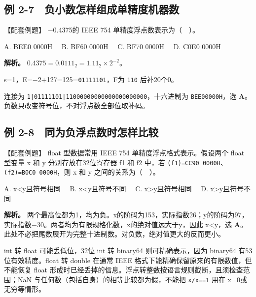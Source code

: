 \subsection{例 2-7　负小数怎样组成单精度机器数}\label{CO02-19}

\begin{example}[配套例题]

【配套例题】 \ensuremath{-}0.4375的 IEEE 754 单精度浮点数表示为（　）。

A. BEE0 0000H　 B. BF60 0000H　 C. BF70 0000H　 D. C0E0 0000H

\end{example}

\textbf{解析。} \(0.4375=0.0111_2=1.11_2\times2^{-2}\)。

s=1，E=\ensuremath{-}2+127=125=\texttt{01111101}，F为 \texttt{110} 后补20个0。

连接为 \texttt{1|01111101|11000000000000000000000}，十六进制为 \texttt{BEE00000H}，选 \textbf{A}。负数只改变符号位，不对浮点数全部位取补码。

\subsection{例 2-8　同为负浮点数时怎样比较}\label{CO02-20}

\begin{example}[配套例题]

【配套例题】 float 型数据常用 IEEE 754 单精度浮点格式表示。假设两个 float 型变量 x 和 y 分别存放在32位寄存器 f1 和 f2 中，若 \texttt{(\allowbreak{}f1)\allowbreak{}=\allowbreak{}CC90 0000H}、\texttt{(\allowbreak{}f2)\allowbreak{}=\allowbreak{}B0C0 0000H}，则 x 和 y 之间的关系为（　）。

A. x\textless y且符号相同　 B. x\textless y且符号不同　 C. x\textgreater y且符号相同　 D. x\textgreater y且符号不同

\end{example}

\textbf{解析。} 两个最高位都为1，均为负。x的阶码为153，实际指数26；y的阶码为97，实际指数\ensuremath{-}30。两者均为有限规格化数，x的绝对值远大于y，因此 x\textless y，选 \textbf{A}。此处不必把尾数展开为完整十进制数。对负数，绝对值更大的反而更小。

int 转 float 可能丢低位，32位 int 转 binary64 则可精确表示，因为 binary64 有53位有效精度。float 转 double 在通常 IEEE 格式下能精确保留原来的有限数值，但不能恢复 float 形成时已经丢掉的信息。浮点转整数按语言规则截断，且须检查范围；NaN 与任何数（包括自身）的相等比较都为假，不能把 \texttt{x/\allowbreak{}x=\allowbreak{}=\allowbreak{}1} 用在 x=0或无穷等情形。

